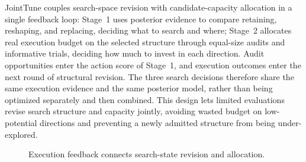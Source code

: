 \documentclass[runningheads]{llncs}
\begin{document}
JointTune couples search-space revision with candidate-capacity allocation
in a single feedback loop: Stage~1 uses posterior evidence to compare
retaining, reshaping, and replacing, deciding what to search and where;
Stage~2 allocates real execution budget on the selected structure through
equal-size audits and informative trials, deciding how much to invest in
each direction. Audit opportunities enter the action score of Stage~1, and
execution outcomes enter the next round of structural revision. The three
search decisions therefore share the same execution evidence and the same
posterior model, rather than being optimized separately and then combined.
This design lets limited evaluations revise search structure and capacity
jointly, avoiding wasted budget on low-potential directions and preventing
a newly admitted structure from being under-explored.

\begin{figure}[htbp]
\centering
{}
\caption{Execution feedback connects search-state revision and allocation.}
\end{figure}
\end{document}
